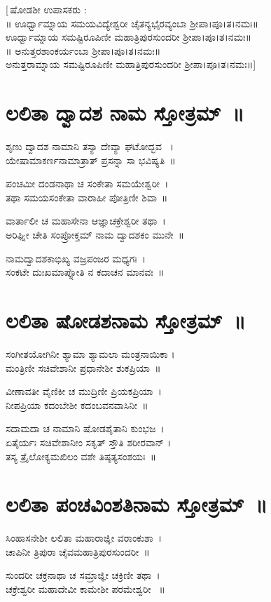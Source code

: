[\,ಷೋಡಶೀ ಉಪಾಸಕರು :\\
॥ ಊರ್ಧ್ವಾಮ್ನಾಯ ಸಮಯವಿದ್ಯೇಶ್ವರೀ ಚೈತನ್ಯಭೈರವ್ಯಂಬಾ ಶ್ರೀಪಾ।ಪೂ।ತ।ನಮಃ॥\\
 ಊರ್ಧ್ವಾಮ್ನಾಯ ಸಮಷ್ಟಿರೂಪಿಣೀ ಮಹಾತ್ರಿಪುರಸುಂದರೀ ಶ್ರೀಪಾ।ಪೂ।ತ।ನಮಃ॥\\
॥ ಅನುತ್ತರಶಾಂಕರ್ಯಂಬಾ ಶ್ರೀಪಾ।ಪೂ।ತ।ನಮಃ॥\\
 ಅನುತ್ತರಾಮ್ನಾಯ ಸಮಷ್ಟಿರೂಪಿಣೀ ಮಹಾತ್ರಿಪುರಸುಂದರೀ ಶ್ರೀಪಾ।ಪೂ।ತ।ನಮಃ॥]\,
\section{ಲಲಿತಾ ದ್ವಾದಶ ನಾಮ ಸ್ತೋತ್ರಮ್~॥}
ಶೃಣು ದ್ವಾದಶ ನಾಮಾನಿ ತಸ್ಯಾ ದೇವ್ಯಾ ಘಟೋದ್ಭವ ~।\\
ಯೇಷಾಮಾಕರ್ಣನಾಮಾತ್ರಾತ್ ಪ್ರಸನ್ನಾ ಸಾ ಭವಿಷ್ಯತಿ~॥

ಪಂಚಮೀ ದಂಡನಾಥಾ ಚ ಸಂಕೇತಾ ಸಮಯೇಶ್ವರೀ~।\\
ತಥಾ ಸಮಯಸಂಕೇತಾ ವಾರಾಹೀ ಪೋತ್ರಿಣೀ ಶಿವಾ~॥

ವಾರ್ತಾಲೀ ಚ ಮಹಾಸೇನಾ ಆಜ್ಞಾಚಕ್ರೇಶ್ವರೀ ತಥಾ~।\\
ಅರಿಘ್ನೀ ಚೇತಿ ಸಂಪ್ರೋಕ್ತಮ್ ನಾಮ ದ್ವಾದಶಕಂ ಮುನೇ~॥

ನಾಮದ್ವಾದಶಕಾಭಿಖ್ಯ ವಜ್ರಪಂಜರ ಮಧ್ಯಗಃ~।\\
ಸಂಕಟೇ ದುಃಖಮಾಪ್ನೋತಿ ನ ಕದಾಚನ ಮಾನವಃ~॥
\section{ಲಲಿತಾ ಷೋಡಶನಾಮ ಸ್ತೋತ್ರಮ್~॥}
ಸಂಗೀತಯೋಗಿನೀ ಶ್ಯಾಮಾ ಶ್ಯಾಮಲಾ ಮಂತ್ರನಾಯಿಕಾ ।\\
ಮಂತ್ರಿಣೀ ಸಚಿವೇಶಾನೀ ಪ್ರಧಾನೇಶೀ ಶುಕಪ್ರಿಯಾ~॥

ವೀಣಾವತೀ ವೈಣಿಕೀ ಚ ಮುದ್ರಿಣೀ ಪ್ರಿಯಕಪ್ರಿಯಾ~।\\
ನೀಪಪ್ರಿಯಾ ಕದಂಬೇಶೀ ಕದಂಬವನವಾಸಿನೀ~॥

ಸದಾಮದಾ ಚ ನಾಮಾನಿ ಷೋಡಶೈತಾನಿ ಕುಂಭಜ~।\\
ಏತೈರ್ಯಃ ಸಚಿವೇಶಾನೀಂ ಸಕೃತ್ ಸ್ತೌತಿ ಶರೀರವಾನ್ ।\\
ತಸ್ಯ ತ್ರೈಲೋಕ್ಯಮಖಿಲಂ ವಶೇ ತಿಷ್ಠತ್ಯಸಂಶಯಃ~॥
\section{ಲಲಿತಾ ಪಂಚವಿಂಶತಿನಾಮ ಸ್ತೋತ್ರಮ್~॥}
ಸಿಂಹಾಸನೇಶೀ ಲಲಿತಾ ಮಹಾರಾಜ್ಞೀ ವರಾಂಕುಶಾ~।\\
ಚಾಪಿನೀ ತ್ರಿಪುರಾ ಚೈವಮಹಾತ್ರಿಪುರಸುಂದರೀ~॥

ಸುಂದರೀ ಚಕ್ರನಾಥಾ ಚ ಸಮ್ರಾಜ್ಞೀ ಚಕ್ರಿಣೀ ತಥಾ~।\\
ಚಕ್ರೇಶ್ವರೀ ಮಹಾದೇವೀ ಕಾಮೇಶೀ ಪರಮೇಶ್ವರೀ ~॥


